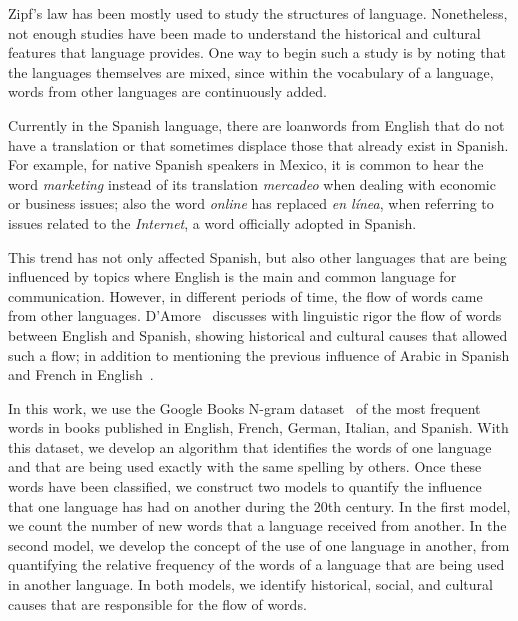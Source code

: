 \documentclass[10pt,letterpaper]{article} %
\begin{document}
Zipf's law has been mostly used to study the structures of language.
Nonetheless, not enough studies have been made to understand the historical and
cultural features that language provides. One way to begin such a study is by
noting that the languages themselves are mixed, since within the vocabulary of
a language, words from other languages are continuously added.


Currently in the Spanish language, there are loanwords from English 
that do not have a translation or that sometimes displace those that already
exist in Spanish.  For example, for native Spanish speakers in Mexico, it is common to
hear the word \textit{marketing} instead of its translation \textit{mercadeo}
when dealing with economic or business issues; also the word \textit{online}
has replaced \textit{en línea}, when referring to issues related to the
\textit{Internet}, a word officially adopted in Spanish.

This trend has not only affected Spanish,  but also other languages that are
being influenced by topics where English is the main and common language for
communication. However, in different periods of time, the flow of words came
from other languages. D’Amore~\cite{Damore_influencia_mutua} discusses with linguistic rigor the
flow of words between English and Spanish,  showing historical  and cultural
causes that allowed such a flow; in addition to mentioning the previous influence of
Arabic in Spanish and French in
English~\cite{gorlach2005dictionary,haspelmath2009loanwords,durkin2014borrowed}. 



In this work, we use the Google Books N-gram dataset~\cite{ngramv} of the most
frequent words in books published in English, French, German, Italian, and
Spanish. With this dataset,  we develop an algorithm that identifies
the words of one language and that are being used exactly with the same 
spelling by others. Once these words
have been classified, we construct two models to quantify the influence that
one language has had on another during the 20th century. In the first model, we
count the number of new words that a language received from another. In
the second model, we develop the concept of the use of one language in
another, from quantifying the relative frequency of  the words of a language
that are being used in another language. In both models, we identify historical, social,
and cultural causes that are responsible for the flow of words.
\end{document}
